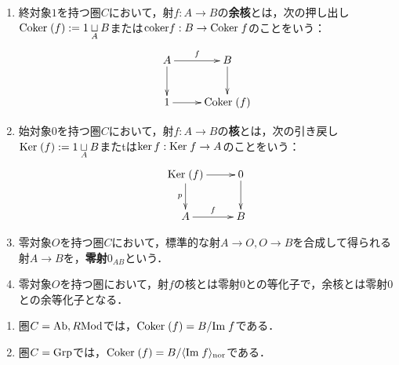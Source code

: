 \documentclass[uplatex,dvipdfmx]{jsreport}
\begin{document}
\begin{definition}\mbox{}
    \begin{enumerate}
        \item 終対象$1$を持つ圏$C$において，射$f:A\to B$の\textbf{余核}とは，次の押し出し$\mathrm{Coker}\;(f):=1\underset{A}{\sqcup}B$または$\mathrm{coker} f:B\to\mathrm{Coker}\; f$のことをいう：
        \[\xymatrix{
            A\ar[r]^-f\ar[d]&B\ar[d]\\
            1\ar[r]&\Coker(f)
        }\]
        \item 始対象$0$を持つ圏$C$において，射$f:A\to B$の\textbf{核}とは，次の引き戻し$\mathrm{Ker}\;(f):=1\underset{A}{\sqcup}B$またtは$\ker f:\mathrm{Ker}\; f\to A$のことをいう：
        \[\xymatrix{
            \Ker(f)\ar[r]\ar[d]_-p&0\ar[d]\\
            A\ar[r]^-f&B
        }\]
        \item 零対象$O$を持つ圏$C$において，標準的な射$A\to O,O\to B$を合成して得られる射$A\to B$を，\textbf{零射}$0_{AB}$という．
        \item 零対象$O$を持つ圏において，射$f$の核とは零射$0$との等化子で，余核とは零射$0$との余等化子となる．
    \end{enumerate}
\end{definition}
\begin{example}\mbox{}
    \begin{enumerate}
        \item 圏$C=\mathrm{Ab},R\mathrm{Mod}$では，$\mathrm{Coker}\;(f)=B/\mathrm{Im}\; f$である．
        \item 圏$C=\mathrm{Grp}$では，$\mathrm{Coker}\;(f)=B/\langle\mathrm{Im}\; f\rangle_{\mathrm{nor}}$である．
    \end{enumerate}
\end{example}
\end{document}
